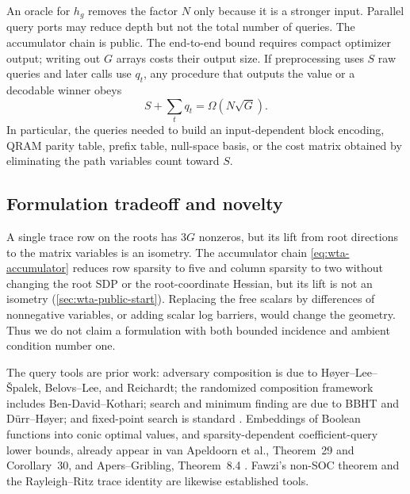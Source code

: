 \begin{remark}
\label{rem:wta-access-scope}
An oracle for $h_g$ removes the factor $N$ only because it is a stronger
input.  Parallel query ports may reduce depth but not the total number of
queries.  The accumulator chain is public.  The end-to-end bound requires
compact optimizer output; writing out $G$ arrays costs their output size.  If preprocessing uses $S$ raw queries and
later calls use $q_t$, any procedure that outputs the value or a decodable
winner obeys
\begin{equation}
 S+\sum_tq_t=\Omega(N\sqrt G).
 \label{eq:wta-setup-charge}
\end{equation}
In particular, the queries needed to build an input-dependent block
encoding, QRAM parity table, prefix table, null-space basis, or the cost
matrix obtained by eliminating the path variables count toward $S$.
\end{remark}

\subsection{Formulation tradeoff and novelty}
\label{sec:wta-scope}

A single trace row on the roots has $3G$ nonzeros, but its lift from root
directions to the matrix variables is an isometry.  The accumulator
chain \eqref{eq:wta-accumulator} reduces row sparsity to five and column
sparsity to two without changing the root SDP or the root-coordinate
Hessian, but its lift is not an isometry (\cref{sec:wta-public-start}).
Replacing the free scalars by differences of nonnegative variables, or
adding scalar log barriers, would change the geometry.  Thus we do not claim
a formulation with both bounded incidence and ambient condition number
one.

The query tools are prior work: adversary composition is due to
Høyer--Lee--Špalek, Belovs--Lee, and Reichardt; the randomized composition
framework includes Ben-David--Kothari; search and minimum finding are due to
BBHT and Dürr--Høyer; and fixed-point search is standard
\cite{hyer2005-tight-adversary-bounds-for-composite,
belovs2020-the-quantum-query-complexity-of,
reichardt2011-reflections-for-quantum-query-algorithms,
bendavid2018-randomized-query-complexity,
boyer1998-tight-bounds-on-quantum-searching,
durr1996-a-quantum-algorithm-for-finding,
yoder2014-fixed-point-quantum-search}.  Embeddings of Boolean functions into
conic optimal values, and sparsity-dependent coefficient-query lower bounds,
already appear in van
Apeldoorn et al., Theorem~29 and Corollary~30, and Apers--Gribling,
Theorem~8.4
\cite{apeldoorn2020-quantum-sdp-solvers,
apers2026-quantum-speedups-linear-programming-interior}.  Fawzi's non-SOC
theorem and the Rayleigh--Ritz trace identity are likewise established
tools.

